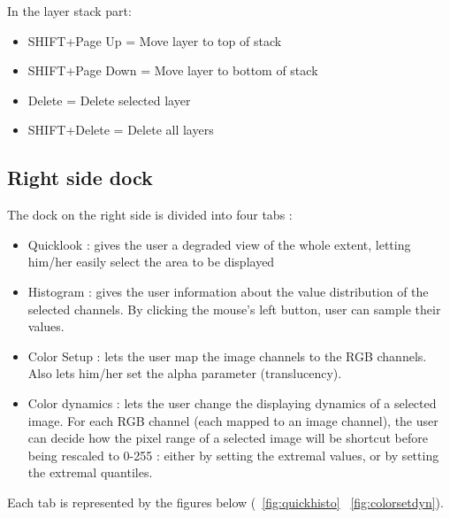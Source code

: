 In the layer stack part:
\begin{itemize}
\item SHIFT+Page Up = Move layer to top of stack
\item SHIFT+Page Down = Move layer to bottom of stack
\item Delete = Delete selected layer
\item SHIFT+Delete = Delete all layers
\end{itemize}


\subsection{Right side dock}
The dock on the right side is divided into four tabs : 
\begin{itemize}
\item Quicklook : gives the user a degraded view of the whole extent, letting him/her easily select the area to be displayed 
\item Histogram : gives the user information about the value distribution of the selected channels. By clicking the mouse's left button, user can sample their values.
\item Color Setup : lets the user map the image channels to the RGB channels. Also lets him/her set the alpha parameter (translucency).
\item Color dynamics : lets the user change the displaying dynamics of a selected image. For each RGB channel (each mapped to an image channel), the user can decide how the pixel range of a selected image will be shortcut before being rescaled to 0-255 : either by setting the extremal values, or by setting the extremal quantiles.
\end{itemize}

Each tab is represented by the figures below (~\ref{fig:quickhisto} ~\ref{fig:colorsetdyn}).

